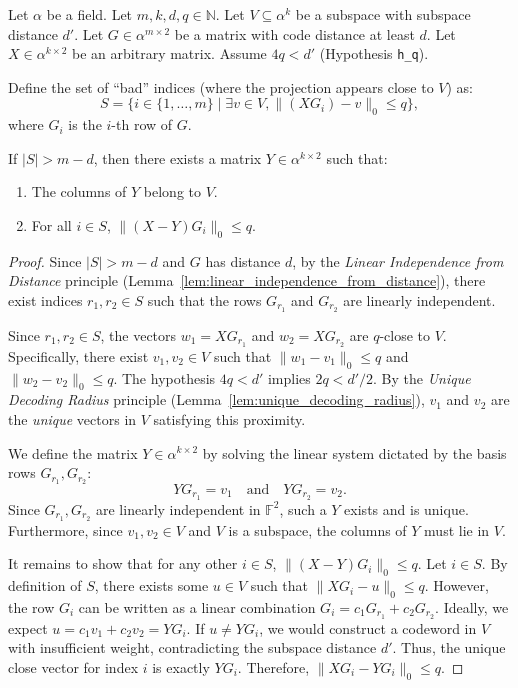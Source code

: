 \begin{lemma}\label{lem:subspace_distance_check_n2_deterministic_core} \leanok
{}
Let $\alpha$ be a field. Let $m, k, d, q \in \mathbb{N}$.
Let $V \subseteq \alpha^k$ be a subspace with subspace distance $d'$.
Let $G \in \alpha^{m \times 2}$ be a matrix with code distance at least $d$.
Let $X \in \alpha^{k \times 2}$ be an arbitrary matrix.
Assume $4q < d'$ (Hypothesis \texttt{h\_q}).

Define the set of ``bad'' indices (where the projection appears close to $V$) as:
\[ S = \{ i \in \{1, \dots, m\} \mid \exists v \in V, \| (X G_i) - v \|_0 \le q \}, \]
where $G_i$ is the $i$-th row of $G$.

If $|S| > m - d$, then there exists a matrix $Y \in \alpha^{k \times 2}$ such that:
\begin{enumerate}
    \item The columns of $Y$ belong to $V$.
    \item For all $i \in S$, $\| (X - Y)G_i \|_0 \le q$.
\end{enumerate}
\end{lemma}
\begin{proof} \leanok
Since $|S| > m - d$ and $G$ has distance $d$, by the \emph{Linear Independence from Distance} principle (Lemma~\ref{lem:linear_independence_from_distance}), there exist indices $r_1, r_2 \in S$ such that the rows $G_{r_1}$ and $G_{r_2}$ are linearly independent.

Since $r_1, r_2 \in S$, the vectors $w_1 = X G_{r_1}$ and $w_2 = X G_{r_2}$ are $q$-close to $V$. Specifically, there exist $v_1, v_2 \in V$ such that $\|w_1 - v_1\|_0 \le q$ and $\|w_2 - v_2\|_0 \le q$.
The hypothesis $4q < d'$ implies $2q < d'/2$. By the \emph{Unique Decoding Radius} principle (Lemma~\ref{lem:unique_decoding_radius}), $v_1$ and $v_2$ are the \emph{unique} vectors in $V$ satisfying this proximity.

We define the matrix $Y \in \alpha^{k \times 2}$ by solving the linear system dictated by the basis rows $G_{r_1}, G_{r_2}$:
\[ Y G_{r_1} = v_1 \quad \text{and} \quad Y G_{r_2} = v_2. \]
Since $G_{r_1}, G_{r_2}$ are linearly independent in $\mathbb{F}^2$, such a $Y$ exists and is unique. Furthermore, since $v_1, v_2 \in V$ and $V$ is a subspace, the columns of $Y$ must lie in $V$.

It remains to show that for any other $i \in S$, $\| (X - Y)G_i \|_0 \le q$.
Let $i \in S$. By definition of $S$, there exists some $u \in V$ such that $\| X G_i - u \|_0 \le q$.
However, the row $G_i$ can be written as a linear combination $G_i = c_1 G_{r_1} + c_2 G_{r_2}$.
Ideally, we expect $u = c_1 v_1 + c_2 v_2 = Y G_i$.
If $u \neq Y G_i$, we would construct a codeword in $V$ with insufficient weight, contradicting the subspace distance $d'$.
Thus, the unique close vector for index $i$ is exactly $Y G_i$.
Therefore, $\| X G_i - Y G_i \|_0 \le q$.
\end{proof}


